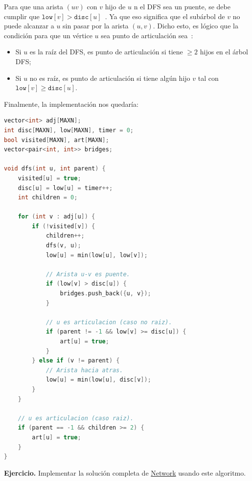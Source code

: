 \begin{figure}[H]
\centering
{}
\end{figure}
Para que una arista $(uv)$  con $v$ hijo de $u$ n el DFS sea un puente, se debe cumplir que $\texttt{low}[v] > \texttt{disc}[u]$~\cite{cpalgos_bridges}. Ya que eso significa que el subárbol de $v$ no puede alcanzar a $u$ sin pasar por la arista $(u,v)$. Dicho esto, es lógico que la condición para que un vértice $u$ sea punto de articulación sea~\cite{cf_bridges}:
\begin{itemize}
    \item Si $u$ es la raíz del DFS, es punto de articulación si tiene
          $\geq 2$ hijos en el árbol DFS;
    \item Si $u$ no es raíz, es punto de articulación si tiene algún hijo $v$ tal con $\texttt{low}[v] \geq \texttt{disc}[u]$.
\end{itemize}
Finalmente, la implementación nos quedaría:
\begin{lstlisting}[language=C++]
vector<int> adj[MAXN];
int disc[MAXN], low[MAXN], timer = 0;
bool visited[MAXN], art[MAXN];
vector<pair<int, int>> bridges;

void dfs(int u, int parent) {
    visited[u] = true;
    disc[u] = low[u] = timer++;
    int children = 0;

    for (int v : adj[u]) {
        if (!visited[v]) {
            children++;
            dfs(v, u);
            low[u] = min(low[u], low[v]);

            // Arista u-v es puente.
            if (low[v] > disc[u]) {
                bridges.push_back({u, v});
            }

            // u es articulacion (caso no raiz).
            if (parent != -1 && low[v] >= disc[u]) {
                art[u] = true;
            }
        } else if (v != parent) {
            // Arista hacia atras.
            low[u] = min(low[u], disc[v]);
        }
    }

    // u es articulacion (caso raiz).
    if (parent == -1 && children >= 2) {
        art[u] = true;
    }
}
\end{lstlisting}
\textbf{Ejercicio.} Implementar la solución completa de \href{https://onlinejudge.org/external/3/315.pdf}{Network} usando
este algoritmo.
 
